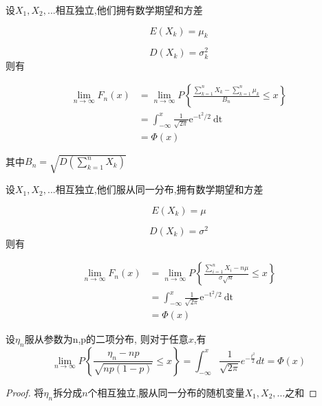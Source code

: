\begin{theorem}[Lyapunov中心极限定理]
    设$X_1,X_2,...$相互独立,他们拥有数学期望和方差

$$
 E(X_k) = \mu_k
$$

$$
  D(X_k) = \sigma_k^2
$$
则有

$$
\begin{aligned} \lim _{n \rightarrow \infty} F_{n}(x) &=\lim _{n \rightarrow \infty} P\left\{\frac{\sum_{k=1}^{n} X_{k}-\sum_{k=1}^{n} \mu_{k}}{B_{n}} \leq x\right\}
\\ &=\int_{-\infty}^{x} \frac{1}{\sqrt{2 \pi}} \mathrm{e}^{-\mathrm{t}^{2} / 2} \mathrm{~d} \mathrm{t}
\\&=\Phi(x)
 \end{aligned}
 $$

其中$B_n=\sqrt{D\left(\sum_{k=1}^{n} X_{k}\right)}$
\end{theorem}

\begin{theorem}
    设$X_1,X_2,...$相互独立,他们服从同一分布,拥有数学期望和方差

$$
 E(X_k) = \mu
$$

$$
  D(X_k) = \sigma^2
$$
则有

$$\begin{aligned}
\lim _{n \rightarrow \infty} F_{n}(x)&=\lim _{n \rightarrow \infty} P\left\{\frac{\sum_{i=1}^{n} X_{i}-n \mu}{\sigma \sqrt{n}} \leq x\right\}
\\ &=\int_{-\infty}^{x} \frac{1}{\sqrt{2 \pi}} \mathrm{e}^{-\mathrm{t}^{2} / 2} \mathrm{~d} \mathrm{t}
\\&=\Phi(x)
\end{aligned}
$$
\end{theorem}

\begin{theorem}
设$\eta_{n}$服从参数为n,p的二项分布, 则对于任意$x$,有
$$
\lim _{n \rightarrow \infty} P\left\{\frac{\eta_{n}-n p}{\sqrt{n p(1-p)}} \leq x\right\}=\int_{-\infty}^{x} \frac{1}{\sqrt{2 \pi}} e^{-\frac{t^{2}}{2}} d t=\Phi(x)
$$
\end{theorem}

\begin{proof}
    将$\eta_{n}$拆分成$n$个相互独立,服从同一分布的随机变量$X_1,X_2,...$之和
\end{proof}


